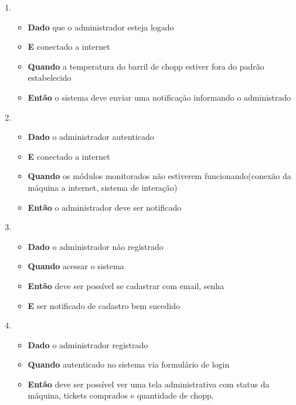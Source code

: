 \begin{enumerate}
\begin{enumerate}
					\item 
						\begin{itemize}
							\item \textbf{Dado} que o administrador esteja logado
							\item \textbf{E} conectado a internet 
							\item \textbf{Quando} a temperatura do barril de chopp estiver fora do padrão estabelecido
							\item \textbf{Então} o sistema deve enviar uma notificação informando o administrado
						\end{itemize}

					\item 
						\begin{itemize}
							\item \textbf{Dado} o administrador autenticado
							\item \textbf{E} conectado a internet
							\item \textbf{Quando} os módulos monitorados não estiverem funcionando(conexão da máquina a internet, sistema de interação)
							\item \textbf{Então} o administrador deve ser notificado
						\end{itemize}

					\item 
						\begin{itemize}
							\item \textbf{Dado} o administrador não registrado
							\item \textbf{Quando} acessar o sistema
							\item \textbf{Então} deve ser possível se cadastrar com email, senha
							\item \textbf{E} ser notificado de cadastro bem sucedido
						\end{itemize}

					\item 
						\begin{itemize}
							\item \textbf{Dado} o administrador registrado
							\item \textbf{Quando} autenticado no sistema via formulário de login
							\item \textbf{Então} deve ser possível ver uma tela administrativa com status da máquina, tickets comprados e quantidade de chopp.
						\end{itemize}
				\end{enumerate}


\end{enumerate}
